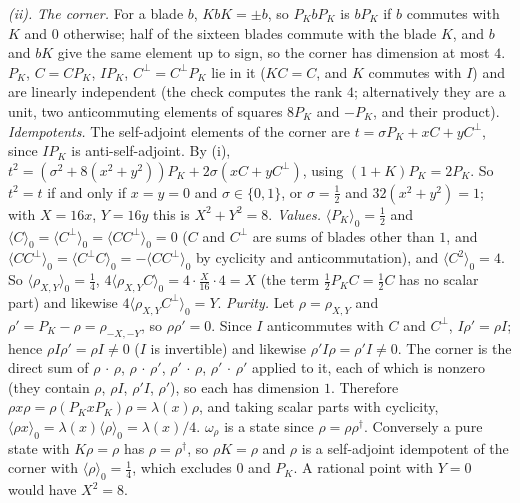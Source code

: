 \emph{(ii).} \emph{The corner.} For a blade $b$, $KbK = \pm b$, so $P_{K}bP_{K}$ is $bP_{K}$ if $b$ commutes with $K$ and $0$ otherwise; half of the sixteen blades commute with the blade $K$, and $b$ and $bK$ give the same element up to sign, so the corner has dimension at most $4$. $P_{K}$, $C = CP_{K}$, $IP_{K}$, $C^{\perp} = C^{\perp}P_{K}$ lie in it ($KC = C$, and $K$ commutes with $I$) and are linearly independent (the check computes the rank $4$; alternatively they are a unit, two anticommuting elements of squares $8P_{K}$ and $-P_{K}$, and their product). \emph{Idempotents.} The self-adjoint elements of the corner are $t = \sigma P_{K} + xC + yC^{\perp}$, since $IP_{K}$ is anti-self-adjoint. By (i), $t^{2} = (\sigma^{2} + 8(x^{2} + y^{2}))P_{K} + 2\sigma(xC + yC^{\perp})$, using $(1 + K)P_{K} = 2P_{K}$. So $t^{2} = t$ if and only if $x = y = 0$ and $\sigma \in \{0, 1\}$, or $\sigma = \tfrac12$ and $32(x^{2} + y^{2}) = 1$; with $X = 16x$, $Y = 16y$ this is $X^{2} + Y^{2} = 8$. \emph{Values.} $\langle P_{K}\rangle_{0} = \tfrac12$ and $\langle C\rangle_{0} = \langle C^{\perp}\rangle_{0} = \langle CC^{\perp}\rangle_{0} = 0$ ($C$ and $C^{\perp}$ are sums of blades other than $1$, and $\langle CC^{\perp}\rangle_{0} = \langle C^{\perp}C\rangle_{0} = -\langle CC^{\perp}\rangle_{0}$ by cyclicity and anticommutation), and $\langle C^{2}\rangle_{0} = 4$. So $\langle\rho_{X,Y}\rangle_{0} = \tfrac14$, $4\langle\rho_{X,Y}C\rangle_{0} = 4 \cdot \tfrac{X}{16} \cdot 4 = X$ (the term $\tfrac12P_{K}C = \tfrac12C$ has no scalar part) and likewise $4\langle\rho_{X,Y}C^{\perp}\rangle_{0} = Y$. \emph{Purity.} Let $\rho = \rho_{X,Y}$ and $\rho' = P_{K} - \rho = \rho_{-X,-Y}$, so $\rho\rho' = 0$. Since $I$ anticommutes with $C$ and $C^{\perp}$, $I\rho' = \rho I$; hence $\rho I\rho' = \rho I \ne 0$ ($I$ is invertible) and likewise $\rho'I\rho = \rho'I \ne 0$. The corner is the direct sum of $\rho\,\cdot\,\rho$, $\rho\,\cdot\,\rho'$, $\rho'\,\cdot\,\rho$, $\rho'\,\cdot\,\rho'$ applied to it, each of which is nonzero (they contain $\rho$, $\rho I$, $\rho'I$, $\rho'$), so each has dimension $1$. Therefore $\rho x\rho = \rho(P_{K}xP_{K})\rho = \lambda(x)\rho$, and taking scalar parts with cyclicity, $\langle\rho x\rangle_{0} = \lambda(x)\langle\rho\rangle_{0} = \lambda(x)/4$. $\omega_{\rho}$ is a state since $\rho = \rho\rho^{\dagger}$. Conversely a pure state with $K\rho = \rho$ has $\rho = \rho^{\dagger}$, so $\rho K = \rho$ and $\rho$ is a self-adjoint idempotent of the corner with $\langle\rho\rangle_{0} = \tfrac14$, which excludes $0$ and $P_{K}$. A rational point with $Y = 0$ would have $X^{2} = 8$.

